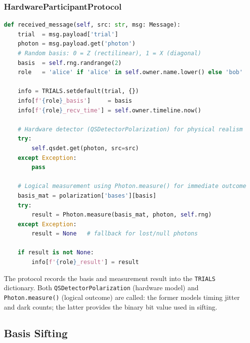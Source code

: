 \documentclass[12pt,oneside,letterpaper,english]{article}
\begin{document}
\subsubsection{HardwareParticipantProtocol}

\begin{lstlisting}[language=Python, caption={Measurement protocol with hardware detector integration}, label={lst:hwproto}]
def received_message(self, src: str, msg: Message):
    trial  = msg.payload['trial']
    photon = msg.payload.get('photon')
    # Random basis: 0 = Z (rectilinear), 1 = X (diagonal)
    basis  = self.rng.randrange(2)
    role   = 'alice' if 'alice' in self.owner.name.lower() else 'bob'

    info = TRIALS.setdefault(trial, {})
    info[f'{role}_basis']     = basis
    info[f'{role}_recv_time'] = self.owner.timeline.now()

    # Hardware detector (QSDetectorPolarization) for physical realism
    try:
        self.qsdet.get(photon, src=src)
    except Exception:
        pass

    # Logical measurement using Photon.measure() for immediate outcome
    basis_mat = polarization['bases'][basis]
    try:
        result = Photon.measure(basis_mat, photon, self.rng)
    except Exception:
        result = None   # fallback for lost/null photons

    if result is not None:
        info[f'{role}_result'] = result
\end{lstlisting}

The protocol records the basis and measurement result into the \texttt{TRIALS} dictionary. Both \texttt{QSDetectorPolarization} (hardware model) and \texttt{Photon.measure()} (logical outcome) are called: the former models timing jitter and dark counts; the latter provides the binary bit value used in sifting.

\subsection{Basis Sifting}
\end{document}
